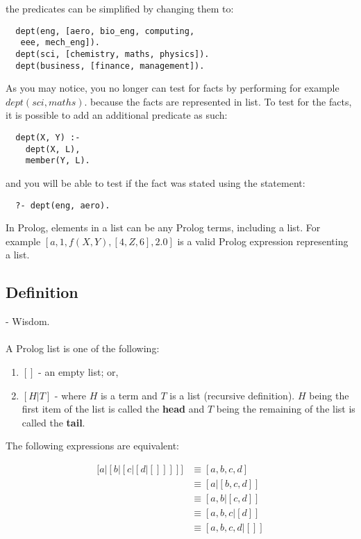 \documentclass{article}
\begin{document}
\begin{multicols}{2}
  the predicates can be simplified by changing them to:
  
  \begin{lstlisting}
  dept(eng, [aero, bio_eng, computing,
   eee, mech_eng]).
  dept(sci, [chemistry, maths, physics]).
  dept(business, [finance, management]).
  \end{lstlisting}
  
  As you may notice, you no longer can test for facts by performing for example $dept(sci, maths).$ because the facts are represented in list. To test for the facts, it is possible to add an additional predicate as such:

  \begin{lstlisting}
  dept(X, Y) :-
    dept(X, L),
    member(Y, L).
  \end{lstlisting}
  
  and you will be able to test if the fact was stated using the statement:

  \begin{lstlisting}
  ?- dept(eng, aero).
  \end{lstlisting}
  
  In Prolog, elements in a list can be any Prolog terms, including a list. For example $[a, 1, f(X, Y), [4, Z, 6], 2.0]$ is a valid Prolog expression representing a list.
  
  \subsection{Definition}
  
   - Wisdom.
  
  \paragraph{} A Prolog list is one of the following:
  
  \begin{enumerate}
  \item $[]$ - an empty list; or,
  \item $[H|T]$ - where $H$ is a term and $T$ is a list (recursive definition). $H$ being the first item of the list is called the {\bf head} and $T$ being the remaining of the list is called the {\bf tail}.
  \end{enumerate}
  
  \noindent The following expressions are equivalent:
  
  \begin{equation*}
  \begin{aligned}
  \big [ a \vert [ b \vert [ c \vert [ d \vert []]]] \big] & \equiv [a,b,c,d] \\
  & \equiv [a|[b,c,d]] \\
  & \equiv [a,b|[c,d]] \\
  & \equiv [a,b,c|[d]] \\
  & \equiv [a,b,c,d|[]]
  \end{aligned}
  \end{equation*}  
  

\end{multicols}
\end{document}

